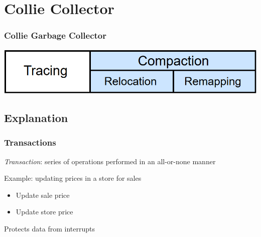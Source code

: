 \documentclass{beamer}
\newcommand{\linespace}{\vskip 0.25cm}
\begin{document}
\section[Collie]{Collie Collector}

\begin{frame}

\frametitle{Collie Garbage Collector}

\begin{center}
\includegraphics[width=.85\textwidth]{Illustrations/gc_cycle_locator_compaction.png}
\end{center}

\end{frame}



\subsection*{Explanation}

\begin{frame}

\frametitle{Transactions}

\emph{Transaction}: series of operations performed in an all-or-none manner

\linespace
\linespace

Example: updating prices in a store for sales \\
\begin{itemize}
\item Update sale price
\item Update store price
\end{itemize}

\linespace
\linespace

Protects data from interrupts

%

\end{frame}
\end{document}
